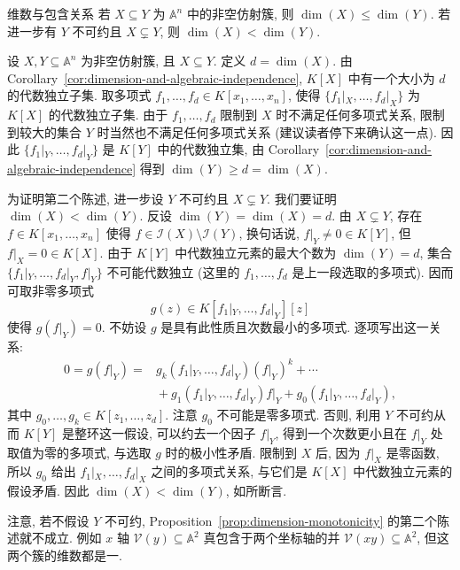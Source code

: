\begin{Proposition}{维数与包含关系}\leavevmode\label{prop:dimension-monotonicity}
若 $X\subseteq Y$ 为 $\mathbb{A}^{n}$ 中的非空仿射簇, 则 $\dim(X)\leq\dim(Y)$. 若进一步有 $Y$ 不可约且 $X\subsetneq Y$, 则 $\dim(X)<\dim(Y)$.
\end{Proposition}
\begin{Proof}
设 $X,Y\subseteq\mathbb{A}^{n}$ 为非空仿射簇, 且 $X\subseteq Y$. 定义 $d=\dim(X)$. 由 Corollary~\ref{cor:dimension-and-algebraic-independence}, $K[X]$ 中有一个大小为 $d$ 的代数独立子集. 取多项式 $f_{1},\ldots,f_{d}\in K[x_{1},\ldots,x_{n}]$, 使得 $\{f_{1}|_{X},\ldots,f_{d}|_{X}\}$ 为 $K[X]$ 的代数独立子集. 由于 $f_{1},\ldots,f_{d}$ 限制到 $X$ 时不满足任何多项式关系, 限制到较大的集合 $Y$ 时当然也不满足任何多项式关系 (建议读者停下来确认这一点). 因此 $\{f_{1}|_{Y},\ldots,f_{d}|_{Y}\}$ 是 $K[Y]$ 中的代数独立集, 由 Corollary~\ref{cor:dimension-and-algebraic-independence} 得到 $\dim(Y)\geq d=\dim(X)$.

为证明第二个陈述, 进一步设 $Y$ 不可约且 $X\subsetneq Y$. 我们要证明 $\dim(X)<\dim(Y)$. 反设 $\dim(Y)=\dim(X)=d$. 由 $X\subsetneq Y$, 存在 $f\in K[x_{1},\ldots,x_{n}]$ 使得 $f\in\mathcal{I}(X)\setminus\mathcal{I}(Y)$, 换句话说, $f|_{Y}\neq0\in K[Y]$, 但 $f|_{X}=0\in K[X]$. 由于 $K[Y]$ 中代数独立元素的最大个数为 $\dim(Y)=d$, 集合 $\{f_{1}|_{Y},\ldots,f_{d}|_{Y},f|_{Y}\}$ 不可能代数独立 (这里的 $f_{1},\ldots,f_{d}$ 是上一段选取的多项式). 因而可取非零多项式
\[
  g(z)\in K[f_{1}|_{Y},\ldots,f_{d}|_{Y}][z]
\]
使得 $g(f|_{Y})=0$. 不妨设 $g$ 是具有此性质且次数最小的多项式. 逐项写出这一关系:
\[
  \begin{aligned}
    0=g(f|_{Y})={}&g_{k}(f_{1}|_{Y},\ldots,f_{d}|_{Y})(f|_{Y})^{k}+\cdots\\
                &{}+g_{1}(f_{1}|_{Y},\ldots,f_{d}|_{Y})f|_{Y}
                  +g_{0}(f_{1}|_{Y},\ldots,f_{d}|_{Y}),
  \end{aligned}
\]
其中 $g_{0},\ldots,g_{k}\in K[z_{1},\ldots,z_{d}]$. 注意 $g_{0}$ 不可能是零多项式. 否则, 利用 $Y$ 不可约从而 $K[Y]$ 是整环这一假设, 可以约去一个因子 $f|_{Y}$, 得到一个次数更小且在 $f|_{Y}$ 处取值为零的多项式, 与选取 $g$ 时的极小性矛盾. 限制到 $X$ 后, 因为 $f|_{X}$ 是零函数, 所以 $g_{0}$ 给出 $f_{1}|_{X},\ldots,f_{d}|_{X}$ 之间的多项式关系, 与它们是 $K[X]$ 中代数独立元素的假设矛盾. 因此 $\dim(X)<\dim(Y)$, 如所断言.
\end{Proof}

注意, 若不假设 $Y$ 不可约, Proposition~\ref{prop:dimension-monotonicity} 的第二个陈述就不成立. 例如 $x$ 轴 $\mathcal{V}(y)\subseteq\mathbb{A}^{2}$ 真包含于两个坐标轴的并 $\mathcal{V}(xy)\subseteq\mathbb{A}^{2}$, 但这两个簇的维数都是一.

